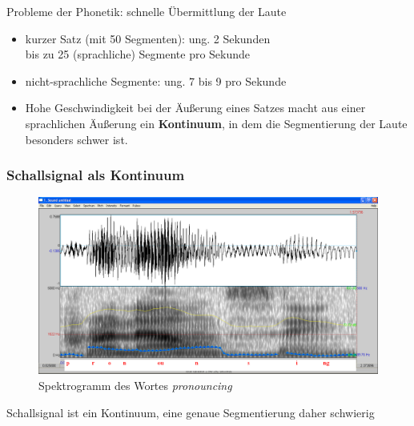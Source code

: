 \begin{frame}{Probleme der Phonetik: schnelle Übermittlung der Laute}

\begin{itemize}
	\item kurzer Satz (mit 50 Segmenten): ung. 2 Sekunden\\
		\dash bis zu 25 (sprachliche) Segmente pro Sekunde
\medskip
	\item nicht-sprachliche Segmente: ung. 7 bis 9 pro Sekunde
	\item[\ra] Hohe Geschwindigkeit bei der Äußerung eines Satzes macht aus einer sprachlichen Äußerung ein \textbf{Kontinuum}, in dem die Segmentierung der Laute besonders schwer ist.
\end{itemize}


\end{frame}


\begin{frame}
\frametitle{Schallsignal als Kontinuum}

	\begin{figure}[H]
	\centering
	
	\includegraphics[scale=0.2]{material/04Pronouncing}
	\caption{Spektrogramm des Wortes \emph{pronouncing}}
	\end{figure}

Schallsignal ist ein Kontinuum, eine genaue Segmentierung daher schwierig
	
\end{frame}


